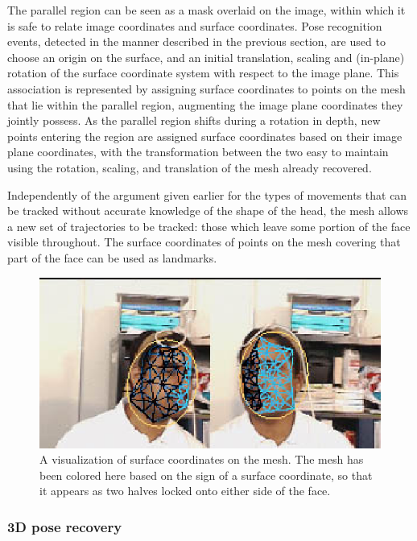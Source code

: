 The parallel region can be seen as a mask overlaid on the image,
within which it is safe to relate image coordinates and surface
coordinates.  Pose recognition events, detected in the manner
described in the previous section, are used to choose an origin on the
surface, and an initial translation, scaling and (in-plane) rotation
of the surface coordinate system with respect to the image plane.
This association is represented by assigning surface coordinates to
points on the mesh that lie within the parallel region, augmenting the
image plane coordinates they jointly possess.  As the parallel region
shifts during a rotation in depth, new points entering the region are
assigned surface coordinates based on their image plane coordinates,
with the transformation between the two easy to maintain using the
rotation, scaling, and translation of the mesh already recovered.

Independently of the argument given earlier for the types of movements
that can be tracked without accurate knowledge of the shape of the
head, the mesh allows a new set of trajectories to be tracked: those
which leave some portion of the face visible throughout.  The surface
coordinates of points on the mesh covering that part of the face can
be used as landmarks.

\begin{figure}[tbp]
\centerline{
\includegraphics[width=\columnwidth]{mesh-dark-left.eps}
}
\caption{ 
%
A visualization of surface coordinates on the mesh.  The mesh has been
colored here based on the sign of a surface coordinate, so that it
appears as two halves locked onto either side of the face.
%
}
\label{fig:mesh-running}
\end{figure}


\subsubsection*{3D pose recovery}


